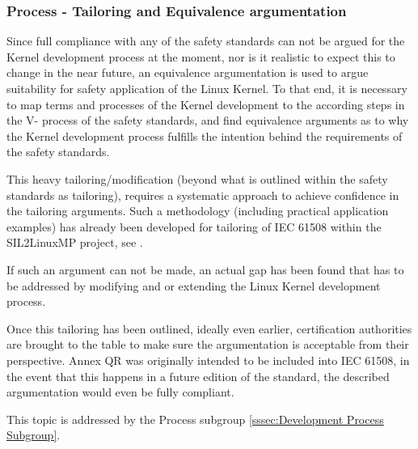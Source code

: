 \documentclass[12pt]{../Common_files/ElisaPaper}
\begin{document}
\subsubsection{Process - Tailoring and Equivalence argumentation}
Since full compliance with any of the safety standards can not be argued for the Kernel development process at the moment, nor is it realistic to expect this to change in the near future, an equivalence argumentation is used to argue suitability for safety application of the Linux Kernel.
To that end, it is necessary to map terms and processes of the Kernel development to the according steps in the V- process of the safety standards, and find equivalence arguments as to why the Kernel development process fulfills the intention behind the requirements of the safety standards.

This heavy tailoring/modification (beyond what is outlined within the safety standards as tailoring), requires a systematic approach to achieve confidence in the tailoring arguments.
Such a methodology (including practical application examples) has already been developed for tailoring of IEC 61508 within the SIL2LinuxMP project, see \cite{AnnexQR}.

If such an argument can not be made, an actual gap has been found that has to be addressed by modifying and or extending the Linux Kernel development process.

Once this tailoring has been outlined, ideally even earlier, certification authorities are brought to the table to make sure the argumentation is acceptable from their perspective.
Annex QR was originally intended to be included into IEC 61508, in the event that this happens in a future edition of the standard, the described argumentation would even be fully compliant.

This topic is addressed by the Process subgroup \ref{sssec:Development Process Subgroup}.
\end{document}
